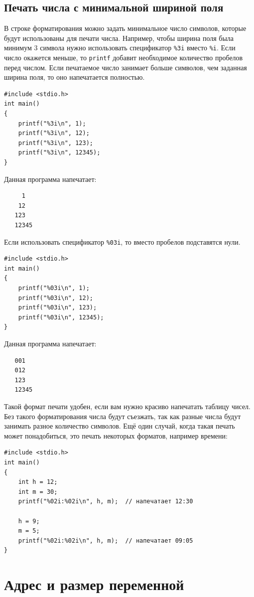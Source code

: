 \documentclass[10pt]{article}
\begin{document}
\subsection*{Печать числа с минимальной шириной поля}
В строке форматирования можно задать минимальное число символов, которые будут использованы для печати числа. Например, чтобы ширина поля была минимум 3 символа нужно использовать спецификатор \texttt{\%3i} вместо \texttt{\%i}.
Если число окажется меньше, то \texttt{printf} добавит необходимое количество пробелов перед числом. Если печатаемое число занимает больше символов, чем заданная ширина поля, то оно напечатается полностью.
\begin{lstlisting}
#include <stdio.h>
int main()
{
    printf("%3i\n", 1);
    printf("%3i\n", 12);
    printf("%3i\n", 123);
    printf("%3i\n", 12345);
}
\end{lstlisting}
Данная программа напечатает:
\begin{verbatim}
     1
    12
   123
   12345
\end{verbatim}
Если использовать спецификатор \texttt{\%03i}, то вместо пробелов подставятся нули.
\begin{lstlisting}
#include <stdio.h>
int main()
{
    printf("%03i\n", 1);
    printf("%03i\n", 12);
    printf("%03i\n", 123);
    printf("%03i\n", 12345);
}
\end{lstlisting}
Данная программа напечатает:
\begin{verbatim}
   001
   012
   123
   12345
\end{verbatim}
Такой формат печати удобен, если вам нужно красиво напечатать таблицу чисел. Без такого форматирования числа будут съезжать, так как разные числа будут занимать разное количество символов. Ещё один случай, когда такая печать может понадобиться, это печать некоторых форматов, например времени:
\begin{lstlisting}
#include <stdio.h>
int main()
{
	int h = 12;
	int m = 30;
	printf("%02i:%02i\n", h, m);  // напечатает 12:30
	
	h = 9;
	m = 5;
	printf("%02i:%02i\n", h, m);  // напечатает 09:05
}
\end{lstlisting}


\newpage
\section*{Адрес и размер переменной}
\end{document}
